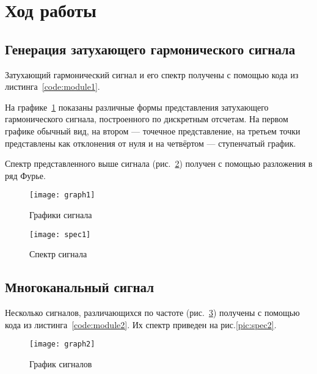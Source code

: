 \section{Ход работы}

\subsection{Генерация затухающего гармонического сигнала}

Затухающий гармонический сигнал и его спектр получены с помощью кода из листинга~\ref{code:module1}.

На графике~\ref{pic:graph1} показаны различные формы представления затухающего гармонического сигнала, построенного
по дискретным отсчетам. На первом графике обычный вид, на втором --- точечное представление, на третьем точки представлены
как отклонения от нуля и на четвёртом --- ступенчатый график.

Спектр представленного выше сигнала (рис.~\ref{pic:spec1}) получен с помощью разложения в ряд Фурье.


\begin{figure}[H]
	\begin{center}
		\texttt{[image: graph1]}
		\caption{Графики сигнала} 
		\label{pic:graph1} %
	\end{center}
\end{figure}

\begin{figure}[H]
	\begin{center}
		\texttt{[image: spec1]}
		\caption{Спектр сигнала} 
		\label{pic:spec1} %
	\end{center}
\end{figure}

\subsection{Многоканальный сигнал}

Несколько сигналов, различающихся по частоте (рис.~\ref{pic:graph2}) получены с помощью кода из листинга~\ref{code:module2}. 
Их спектр приведен на рис.\ref{pic:spec2}.

\begin{figure}[H]
	\begin{center}
		\texttt{[image: graph2]}
		\caption{График сигналов} 
		\label{pic:graph2} %
	\end{center}
\end{figure}

